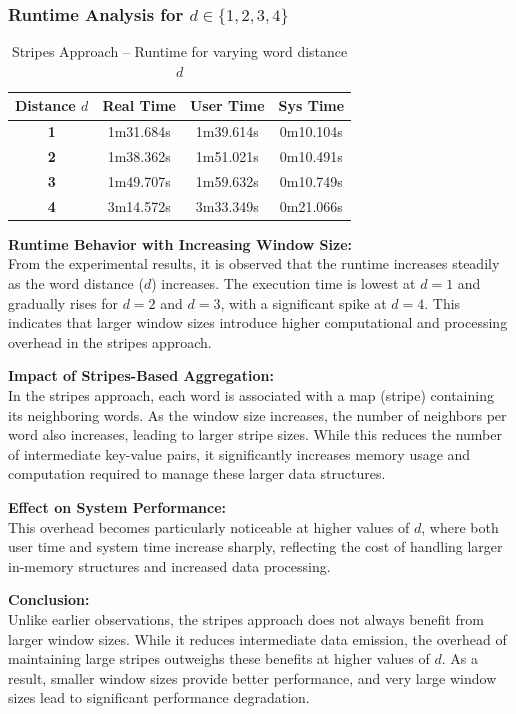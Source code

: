 \documentclass[12pt,a4paper]{article}
\begin{document}
\subsubsection{Runtime Analysis for $d \in \{1, 2, 3, 4\}$}

\begin{table}[H]
  \centering
  \caption{Stripes Approach -- Runtime for varying word distance $d$}
  \label{tab:stripes_runtime}
  \renewcommand{\arraystretch}{1.4}
  \begin{tabular}{>{\bfseries}c ccc}
    \toprule
    \rowcolor{lightblue}
    \textbf{Distance $d$} & \textbf{Real Time} & \textbf{User Time} & \textbf{Sys Time} \\
    \midrule
    1 & 1m31.684s & 1m39.614s & 0m10.104s \\
    2 & 1m38.362s & 1m51.021s & 0m10.491s \\
    3 & 1m49.707s & 1m59.632s & 0m10.749s \\
    4 & 3m14.572s & 3m33.349s & 0m21.066s \\
    \bottomrule
  \end{tabular}
\end{table}

\begin{infobox}
  \textbf{Runtime Behavior with Increasing Window Size:} \\
  From the experimental results, it is observed that the runtime increases steadily as the word distance ($d$) increases. The execution time is lowest at $d = 1$ and gradually rises for $d = 2$ and $d = 3$, with a significant spike at $d = 4$. This indicates that larger window sizes introduce higher computational and processing overhead in the stripes approach.
  \vspace{0.5em}

  \textbf{Impact of Stripes-Based Aggregation:} \\
  In the stripes approach, each word is associated with a map (stripe) containing its neighboring words. As the window size increases, the number of neighbors per word also increases, leading to larger stripe sizes. While this reduces the number of intermediate key-value pairs, it significantly increases memory usage and computation required to manage these larger data structures.
  \vspace{0.5em}

  \textbf{Effect on System Performance:} \\
  This overhead becomes particularly noticeable at higher values of $d$, where both user time and system time increase sharply, reflecting the cost of handling larger in-memory structures and increased data processing.
  \vspace{0.5em}

  \textbf{Conclusion:} \\
  Unlike earlier observations, the stripes approach does not always benefit from larger window sizes. While it reduces intermediate data emission, the overhead of maintaining large stripes outweighs these benefits at higher values of $d$. As a result, smaller window sizes provide better performance, and very large window sizes lead to significant performance degradation.
\end{infobox}
\end{document}
